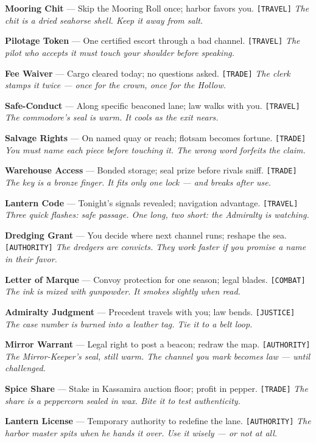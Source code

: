 \begin{enumerate}[label={[\Alph*]}]
\setcounter{enumi}{1}
\item \textbf{Mooring Chit} --- Skip the Mooring Roll once; harbor favors you. \texttt{[TRAVEL]}
  \hfill \textit{The chit is a dried seahorse shell. Keep it away from salt.}
\item \textbf{Pilotage Token} --- One certified escort through a bad channel. \texttt{[TRAVEL]}
  \hfill \textit{The pilot who accepts it must touch your shoulder before speaking.}
\item \textbf{Fee Waiver} --- Cargo cleared today; no questions asked. \texttt{[TRADE]}
  \hfill \textit{The clerk stamps it twice --- once for the crown, once for the Hollow.}
\item \textbf{Safe-Conduct} --- Along specific beaconed lane; law walks with you. \texttt{[TRAVEL]}
  \hfill \textit{The commodore's seal is warm. It cools as the exit nears.}
\item \textbf{Salvage Rights} --- On named quay or reach; flotsam becomes fortune. \texttt{[TRADE]}
  \hfill \textit{You must name each piece before touching it. The wrong word forfeits the claim.}
\item \textbf{Warehouse Access} --- Bonded storage; seal prize before rivals sniff. \texttt{[TRADE]}
  \hfill \textit{The key is a bronze finger. It fits only one lock --- and breaks after use.}
\item \textbf{Lantern Code} --- Tonight's signals revealed; navigation advantage. \texttt{[TRAVEL]}
  \hfill \textit{Three quick flashes: safe passage. One long, two short: the Admiralty is watching.}
\item \textbf{Dredging Grant} --- You decide where next channel runs; reshape the sea. \texttt{[AUTHORITY]}
  \hfill \textit{The dredgers are convicts. They work faster if you promise a name in their favor.}
\item \textbf{Letter of Marque} --- Convoy protection for one season; legal blades. \texttt{[COMBAT]}
  \hfill \textit{The ink is mixed with gunpowder. It smokes slightly when read.}
\item \textbf{Admiralty Judgment} --- Precedent travels with you; law bends. \texttt{[JUSTICE]}
  \hfill \textit{The case number is burned into a leather tag. Tie it to a belt loop.}
\item \textbf{Mirror Warrant} --- Legal right to post a beacon; redraw the map. \texttt{[AUTHORITY]}
  \hfill \textit{The Mirror-Keeper's seal, still warm. The channel you mark becomes law --- until challenged.}
\item \textbf{Spice Share} --- Stake in Kassamira auction floor; profit in pepper. \texttt{[TRADE]}
  \hfill \textit{The share is a peppercorn sealed in wax. Bite it to test authenticity.}
\item \textbf{Lantern License} --- Temporary authority to redefine the lane. \texttt{[AUTHORITY]}
  \hfill \textit{The harbor master spits when he hands it over. Use it wisely --- or not at all.}
\end{enumerate}

